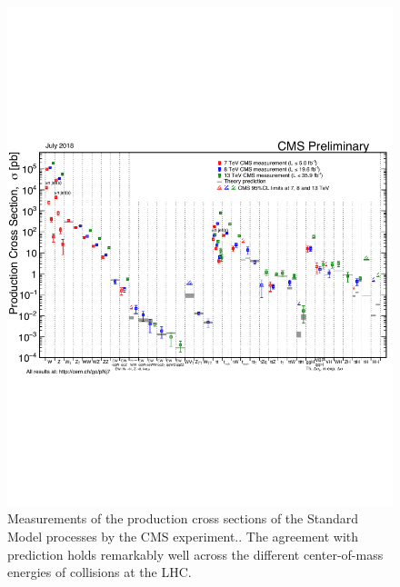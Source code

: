 \begin{figure}[htbp]
  \centering
    \includegraphics[width=6in]{images/SigmaNew_v0}
    \caption[CMS Measurements of SM Production Cross Sections]{Measurements of the production cross sections of the Standard Model processes by the CMS experiment.\cite{CMSSMXSEC}. The agreement with prediction holds remarkably well across the different center-of-mass energies of collisions at the LHC.}
    \label{fig:SMxsec}
\end{figure}


